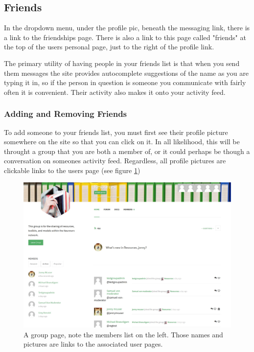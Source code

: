 \documentclass[10pt]{article}
\begin{document}
\subsection{Friends}  \label{Friends}

\begin{flushleft}
In the dropdown menu, under the profile pic, beneath the messaging link, there is a link to the friendships page.  There is also a link to this page called "friends" at the top of the users personal page, just to the right of the profile link.  
\end{flushleft}

\begin{flushleft}
The primary utility of having people in your friends list is that when you send them messages the site provides autocomplete suggestions of the name as you are typing it in, so if the person in question is someone you communicate with fairly often it is convenient. Their activity also makes it onto your activity feed.
\end{flushleft}

\subsubsection{Adding and Removing Friends}

\begin{flushleft}
To add someone to your friends list, you must first see their profile picture somewhere on the site so that you can click on it.  In all likelihood, this will be throught a group that you are both a member of, or it could perhaps be though a conversation on someones activity feed.  Regardless, all profile pictures are clickable links to the users page (see figure \ref{profilelink})
\end{flushleft}

\begin{figure}[H]
    \centering
    \includegraphics[scale=0.3]{images/resources.jpg}
    \caption{A group page, note the members list on the left.  Those names and pictures are links to the associated user pages.}
    \label{profilelink}
\end{figure}
\end{document}
